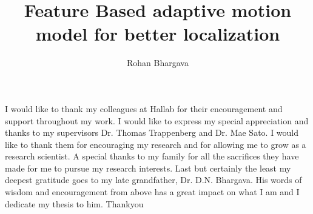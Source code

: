 \documentclass[12pt]{dalcsthesis}
\begin{document}
\mcs  %
\title{Feature Based adaptive motion model for better localization}
\author{Rohan Bhargava}


\providecommand{\tabularnewline}{\\}
\newcommand{\lyxdot}{.}

\frontmatter


\begin{abstract}

\end{abstract}

\begin{acknowledgements}
I would like to thank my colleagues at Hallab for their encouragement and support throughout my work. I would like to express my special appreciation and thanks to my supervisors Dr. Thomas Trappenberg and Dr. Mae Sato. I would like to thank them for encouraging my research and for allowing me to grow as a research scientist. A special thanks to my family for all the sacrifices they have made for me to pursue my research interests. Last but certainly the least my deepest gratitude goes to my late grandfather, Dr. D.N. Bhargava. His words of wisdom and encouragement from above has a great impact on what I am and I dedicate my thesis to him. Thankyou   
\end{acknowledgements}
\end{document}
